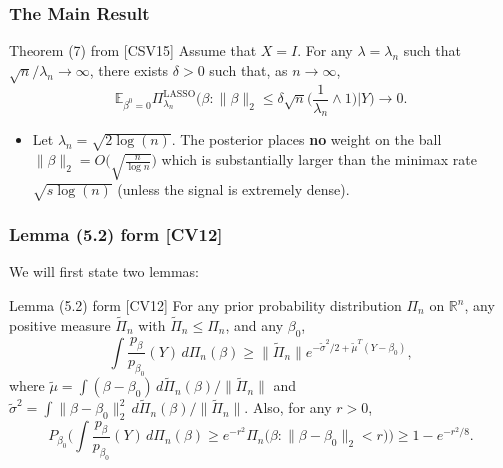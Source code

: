 \documentclass[usenames,dvipsnames]{beamer}
\newcommand{\rn}{\sqrt{n}}
\newcommand{\be}{\beta}
\newcommand{\la}{\lambda}
\newcommand{\s}{\sigma}
\newcommand{\te}{\beta}
\newcommand{\q}{\beta}
\newcommand{\m}{\mu}
\newcommand{\RR}{\mathbb{R}}
\begin{document}
\begin{frame}
	\frametitle{The Main Result}
		\begin{alertblock}{Theorem (7) from [CSV15]} \label{lemlb}
			Assume that $X = I$. For any $\la=\la_n$ such that $\rn/\la_n\to
			\infty$, there exists $\delta>0$ such that, as $n\to\infty$,
			\[
			\mathbb{E}_{\be^0=0} \Pi_{\la_n}^{\mathrm{LASSO}} \biggl(\be: \|\be
			\|_2\le\delta \sqrt{n} \biggl(\frac{1}{\la_n}\wedge1 \biggr) \Big| Y
			\biggr) \rightarrow0.
			\]
		\end{alertblock}
	
		\begin{itemize}
			\item Let $\lambda_n = \sqrt{2\log(n)}$. The posterior places \textbf{no} weight on the ball $\|\be\|_2 = O\Big(\sqrt{\frac{n}{\log n}}\Big)$ which is substantially larger than the minimax rate $\sqrt{s \log(n)}$ {\tiny (unless the signal is extremely dense)}.
		\end{itemize}
\end{frame}


\begin{frame}
\frametitle{Lemma (5.2) form [CV12]}
We will first state two lemmas:
\begin{small}


\begin{exampleblock}{Lemma (5.2) form [CV12]} 
	For any prior probability distribution $\Pi_n$ on $\RR^n$,
	any positive measure $\tilde\Pi_n$ with $\tilde\Pi_n\le\Pi_n$,
	and any $\q_0$,
	\[
	\int\frac{p_{\q}}{p_{\q_0}}(Y) \,d\Pi_n(\q) \ge\|\tilde\Pi_n\|
	e^{-\tilde
		\s^2/2+\tilde\m^T(Y-\q_0) },
	\]
	where $\tilde\m=\int(\q-\q_0) \,d\tilde\Pi_n(\q)/\|\tilde\Pi_n\|$ and
	$\tilde\s^2=\int\|\q-\q_0\|^2_2 \,d\tilde\Pi_n(\q)/\|\tilde\Pi_n\|$.
	Also, for any $r>0$,
	\[
	P_{\q_0} \biggl(\int\frac{p_{\te}}{p_{\te_0}}(Y) \,d\Pi_n(\te) \geq e^{-r^2}
	\Pi_n\bigl(\q:\|\q-\q_0\|_2<r \bigr) \biggr)\geq1 - e^{-r^2/8}.
	\]
\end{exampleblock}
\end{small}
\end{frame}
\end{document}

